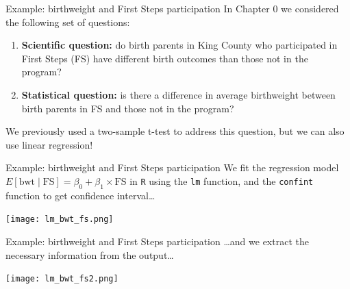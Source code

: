 \documentclass[10pt,t]{beamer}
\begin{document}
\begin{frame}{Example: birthweight and First Steps participation}
In Chapter 0 we considered the following set of questions:

\vspace{0.3cm}

\begin{enumerate}
	\item \textbf{Scientific question:} do birth parents in King County who participated in First Steps (FS) have different birth outcomes than those not in the program?
	\item \textbf{Statistical question:} is there a difference in average birthweight between birth parents in FS and those not in the program?
\end{enumerate}

\vspace{0.3cm} We previously used a two-sample t-test to address this question, but we can also use linear regression!

\end{frame}

\begin{frame}{Example: birthweight and First Steps participation}
We fit the regression model $E[\text{bwt} \mid \text{FS}] = \beta_0 + \beta_1 \times \text{FS}$ in \texttt{R} using the \texttt{lm} function, and the \texttt{confint} function to get confidence interval\dots

\vspace{0.2cm}

\centering \texttt{[image: lm\_bwt\_fs.png]}
\end{frame}

\begin{frame}{Example: birthweight and First Steps participation}
\dots and we extract the necessary information from the output\dots

\vspace{0.2cm}

\centering \texttt{[image: lm\_bwt\_fs2.png]}
\end{frame}
\end{document}

